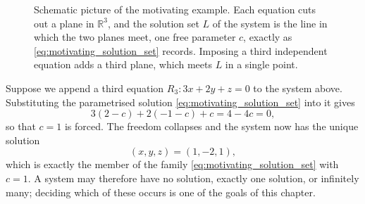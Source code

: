 \begin{figure}[ht!]
  \centering
  \caption{Schematic picture of the motivating example. Each equation cuts out a
  plane in $\mathbb{R}^3$, and the solution set $L$ of the system is the line in
  which the two planes meet, one free parameter $c$, exactly as
  \eqref{eq:motivating_solution_set} records. Imposing a third independent
  equation adds a third plane, which meets $L$ in a single point.}
  \label{fig:two_planes}
\end{figure}

\begin{example}
Suppose we append a third equation $R_3: 3x + 2y + z = 0$ to the system above. Substituting the parametrised solution \eqref{eq:motivating_solution_set} into it gives
\[
3(2 - c) + 2(-1 - c) + c = 4 - 4c = 0,
\]
so that $c = 1$ is forced. The freedom collapses and the system now has the unique solution
\[
(x, y, z) = (1, -2, 1),
\]
which is exactly the member of the family \eqref{eq:motivating_solution_set} with $c = 1$. A system may therefore have no solution, exactly one solution, or infinitely many; deciding which of these occurs is one of the goals of this chapter.
\end{example}

